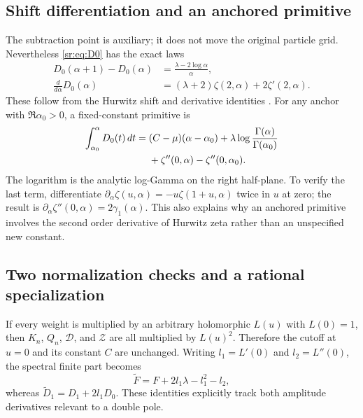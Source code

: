 \documentclass[11pt,letterpaper]{article}
\theoremstyle{definition}
\theoremstyle{remark}
\numberwithin{equation}{section}
\begin{document}
\subsection{Shift differentiation and an anchored primitive}
The subtraction point is auxiliary; it does not move the original
particle grid. Nevertheless \eqref{sr:eq:D0} has the exact laws
\begin{align}
 D_0(\alpha+1)-D_0(\alpha)
 &=\frac{\lambda-2\log\alpha}{\alpha},\label{sr:eq:alpha-shift}\\
 \frac{d}{d\alpha}D_0(\alpha)
 &=(\lambda+2)\zeta(2,\alpha)+2\zeta'(2,\alpha).
 \label{sr:eq:alpha-derivative}
\end{align}
These follow from the Hurwitz shift and derivative identities
\cite[25.11.3 and 25.11.17]{dlmf-hurwitz}. For any anchor with
$\Re\alpha_0>0$, a fixed-constant primitive is
\begin{align}
 \int_{\alpha_0}^{\alpha}D_0(t)\,dt
 ={}&(C-\mu)(\alpha-\alpha_0)
 +\lambda\log\frac{\Gamma(\alpha)}{\Gamma(\alpha_0)}\notag\\
 &+\zeta''(0,\alpha)-\zeta''(0,\alpha_0).
 \label{sr:eq:primitive}
\end{align}
The logarithm is the analytic log-Gamma on the right half-plane.
To verify the last term, differentiate
$\partial_\alpha\zeta(u,\alpha)=-u\zeta(1+u,\alpha)$ twice in
$u$ at zero; the result is
$\partial_\alpha\zeta''(0,\alpha)=2\gamma_1(\alpha)$.
This also explains why an anchored primitive involves the second
order derivative of Hurwitz zeta rather than an unspecified new constant.

\subsection{Two normalization checks and a rational specialization}
If every weight is multiplied by an arbitrary holomorphic $L(u)$
with $L(0)=1$, then $K_n$, $Q_n$, $\mathcal D$, and $\mathcal Z$
are all multiplied by $L(u)^2$. Therefore the cutoff at $u=0$ and
its constant $C$ are unchanged. Writing $l_1=L'(0)$ and
$l_2=L''(0)$, the spectral finite part becomes
\begin{equation}\label{sr:eq:normalization}
 \widetilde F=F+2l_1\lambda-l_1^2-l_2,
\end{equation}
whereas $\widetilde D_1=D_1+2l_1D_0$. These identities explicitly
track both amplitude derivatives relevant to a double pole.
\end{document}
